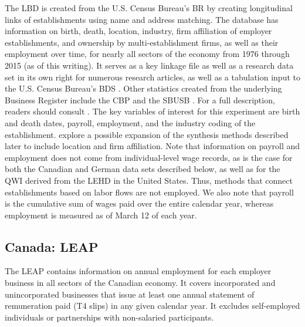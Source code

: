 \documentclass[10pt]{article}
\begin{document}
The \ac{LBD} \citep{LBD} is created from the U.S. Census Bureau's \ac{BR} by creating longitudinal links of establishments using name and address matching. The database has information on birth, death, location, industry,  firm  affiliation of employer establishments, and ownership by multi-establishment firms, as well as their employment over time, for nearly all sectors of the economy from 1976 through 2015 (as of this writing). It serves as a key linkage file as well as a research data set in its own right for numerous research articles, as well as a tabulation input to the U.S. Census Bureau's \acl{BDS} \citep[\acs{BDS}]{BDS}. Other statistics created from the underlying Business Register include the \acl{CBP} \citep[\acs{CBP}]{CBP} and the \acl{SBUSB} \citep[\acs{SBUSB}]{SBUSB}. For a full description, readers should consult  \citet{RePEc:cen:wpaper:02-17,}. The key variables of interest for this experiment are birth and death dates, payroll, employment, and the industry coding of the establishment.  \citet{SJIAOS-2014d} explore a possible expansion of the synthesis methods described later to include location and firm affiliation. Note that information on payroll and employment does not come from individual-level wage records, as is the case for both the Canadian and German data sets described below, as well as for the \acl{QWI} \citep{AbowdEtAl2009} derived from the \acl{LEHD} \citep[LEHD]{RePEc:cen:wpaper:18-27} in the United States. Thus, methods that connect establishments based on labor flows \citep{BenedettoEtAl2007,RePEc:iab:iabfme:201006_en} are not employed. We also note that payroll is the cumulative sum of wages paid over the entire calendar year, whereas employment is measured as of March 12 of each year.









 
\subsection{Canada: \acf{LEAP}}


The \ac{LEAP} \citep{StatisticsCanada2019} contains information on annual employment for each employer business in all sectors of the Canadian economy. It covers incorporated and unincorporated businesses that issue at least one annual statement of remuneration paid (T4 slips) in any given calendar year. It excludes self-employed individuals or partnerships with non-salaried participants.
\end{document}
